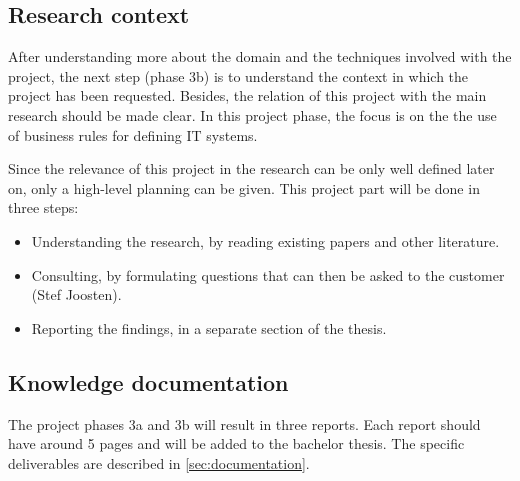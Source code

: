 \subsection{Research context}
%
After understanding more about the domain and the techniques involved with the project, the next step (phase 3b) is to understand the context in which the project has been requested.
Besides, the relation of this project with the main research should be made clear.
In this project phase, the focus is on the the use of business rules for defining IT systems.

Since the relevance of this project in the research can be only well defined later on, only a high-level planning can be given.
This project part will be done in three steps:
\begin{itemize}
	\item Understanding the research, by reading existing papers and other literature.
	\item Consulting, by formulating questions that can then be asked to the customer (Stef Joosten).
	\item Reporting the findings, in a separate section of the thesis.
\end{itemize}

\subsection{Knowledge documentation}
The project phases 3a and 3b will result in three reports.
Each report should have around 5 pages and will be added to the bachelor thesis.
The specific deliverables are described in \autoref{sec:documentation}.

